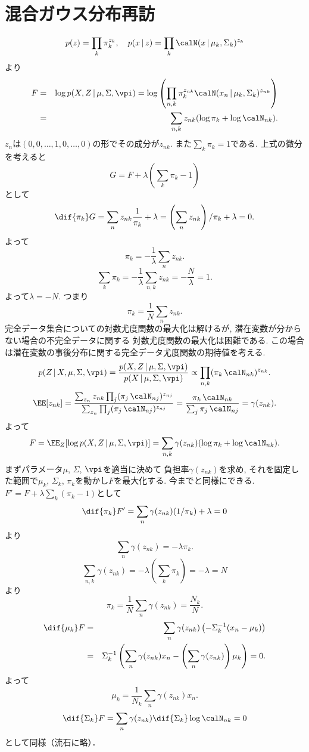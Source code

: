 \section{混合ガウス分布再訪}
$$
p(z)=\prod_k \pi_k^{z_{k}}, \quad p(x\,|\,z)=\prod_k \calN(x\,|\,\mu_k,\Sigma_k)^{z_k}
$$
より
\begin{eqnarray*}
F
 &=& \log p(X,Z\,|\,\mu,\Sigma,\vpi)
 = \log \left(\prod_{n,k} \pi_k^{z_{nk}}\calN(x_n\,|\,\mu_k,\Sigma_k)^{z_{nk}}\right)\\
 &=& \sum_{n,k} z_{nk}(\log \pi_k + \log \calN_{nk}).
\end{eqnarray*}
$z_n$は$(0, 0,\ldots, 1, 0, \ldots, 0)$の形でその成分が$z_{nk}$.
また$\sum_k \pi_k=1$である.
上式の微分を考えると
$$
G=F+\lambda\left(\sum_k \pi_k-1\right)
$$
として
$$
\dif{\pi_k}G=\sum_n z_{nk}\frac{1}{\pi_k}+\lambda=\left(\sum_n z_{nk}\right)/\pi_k + \lambda=0.
$$
よって
$$
\pi_k = -\frac{1}{\lambda}\sum_n z_{nk}.
$$
$$
\sum_k \pi_k=-\frac{1}{\lambda}\sum_{n,k}z_{nk}=-\frac{N}{\lambda}=1.
$$
よって$\lambda=-N$.
つまり
$$
\pi_k=\frac{1}{N}\sum_n z_{nk}.
$$
完全データ集合についての対数尤度関数の最大化は解けるが, 
潜在変数が分からない場合の不完全データに関する
対数尤度関数の最大化は困難である.
この場合は潜在変数の事後分布に関する完全データ尤度関数の期待値を考える.
$$
p(Z\,|\,X,\mu,\Sigma,\vpi)
 = \frac{p(X,Z\,|\,\mu,\Sigma,\vpi)}{p(X\,|\,\mu,\Sigma,\vpi)}
 \propto \prod_{n,k} (\pi_k\,\calN_{nk})^{z_{nk}}.
$$
$$
\EE[z_{nk}]=\frac{\sum_{z_n} z_{nk} \prod_j (\pi_j\,\calN_{nj})^{z_{nj}}}
               {\sum_{z_n} \prod_j(\pi_j\,\calN_{nj})^{z_{nj}}}
         =\frac{\pi_k\,\calN_{nk}}{\sum_j \pi_j\,\calN_{nj}} = \gamma(z_{nk}).
$$
よって
$$
F=\EE_Z[\log p(X,Z\,|\,\mu,\Sigma,\vpi)]=\sum_{n,k}\gamma(z_{nk})(\log \pi_k + \log \calN_{nk}).
$$
まずパラメータ$\mu$, $\Sigma$, $\vpi$を適当に決めて
負担率$\gamma(z_{nk})$を求め,
それを固定した範囲で$\mu_k$, $\Sigma_k$, $\pi_k$を動かし$F$を最大化する.
今までと同様にできる.
$F'=F+\lambda\sum_k\left(\pi_k-1\right)$として
$$
\dif{\pi_k}F'=\sum_n \gamma(z_{nk})(1/\pi_k)+\lambda=0
$$
より
$$
\sum_n \gamma(z_{nk})=-\lambda \pi_k.
$$
$$
\sum_{n,k}\gamma(z_{nk})=-\lambda\left(\sum_k \pi_k\right)=-\lambda=N
$$
より
$$
\pi_k=\frac{1}{N}\sum_n \gamma(z_{nk})=\frac{N_k}{N}.
$$
\begin{eqnarray*}
\dif{\mu_k}F
&=&\sum_n\gamma(z_{nk})\left(-\Sigma_k^{-1}(x_n-\mu_k)\right)
\\
&=&\Sigma_k^{-1}\left(\sum_n \gamma(z_{nk})x_n-\left(\sum_n \gamma(z_{nk})\right)\mu_k\right)=0.
\end{eqnarray*}
よって
$$
\mu_k=\frac{1}{N_k}\sum_n \gamma(z_{nk})x_n.
$$
$$
\dif{\Sigma_k}F=\sum_n \gamma(z_{nk}) \dif{\Sigma_k}\log \calN_{nk}=0
$$
として同様（流石に略）．

